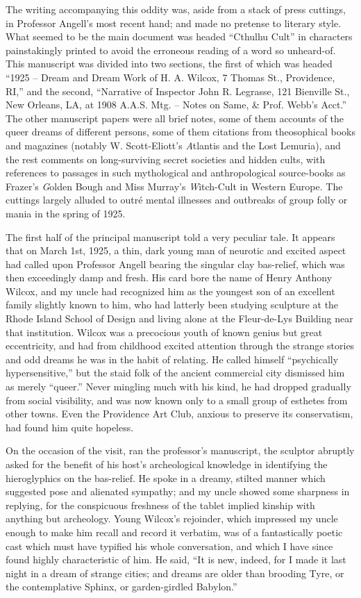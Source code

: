 The writing accompanying this oddity was, aside from a stack of press cuttings, in Professor Angell’s most recent hand; and made no pretense to literary style. What seemed to be the main document was headed “{\sc Cthulhu Cult}” in characters painstakingly printed to avoid the erroneous reading of a word so unheard-of. This manuscript was divided into two sections, the first of which was headed “1925⁠ – Dream and Dream Work of H. A. Wilcox, 7 Thomas St., Providence, RI,” and the second, “Narrative of Inspector John R. Legrasse, 121 Bienville St., New Orleans, LA, at 1908 A.A.S. Mtg.⁠ – Notes on Same, \& Prof. Webb’s Acct.” The other manuscript papers were all brief notes, some of them accounts of the queer dreams of different persons, some of them citations from theosophical books and magazines (notably W. Scott-Eliott’s {\emph Atlantis and the Lost Lemuria}), and the rest comments on long-surviving secret societies and hidden cults, with references to passages in such mythological and anthropological source-books as Frazer’s {\emph Golden Bough} and Miss Murray’s {\emph Witch-Cult in Western Europe}. The cuttings largely alluded to outré mental illnesses and outbreaks of group folly or mania in the spring of 1925.

\sectionbreak

The first half of the principal manuscript told a very peculiar tale. It appears that on March 1st, 1925, a thin, dark young man of neurotic and excited aspect had called upon Professor Angell bearing the singular clay bas-relief, which was then exceedingly damp and fresh. His card bore the name of Henry Anthony Wilcox, and my uncle had recognized him as the youngest son of an excellent family slightly known to him, who had latterly been studying sculpture at the Rhode Island School of Design and living alone at the Fleur-de-Lys Building near that institution. Wilcox was a precocious youth of known genius but great eccentricity, and had from childhood excited attention through the strange stories and odd dreams he was in the habit of relating. He called himself “psychically hypersensitive,” but the staid folk of the ancient commercial city dismissed him as merely “queer.” Never mingling much with his kind, he had dropped gradually from social visibility, and was now known only to a small group of esthetes from other towns. Even the Providence Art Club, anxious to preserve its conservatism, had found him quite hopeless.

On the occasion of the visit, ran the professor’s manuscript, the sculptor abruptly asked for the benefit of his host’s archeological knowledge in identifying the hieroglyphics on the bas-relief. He spoke in a dreamy, stilted manner which suggested pose and alienated sympathy; and my uncle showed some sharpness in replying, for the conspicuous freshness of the tablet implied kinship with anything but archeology. Young Wilcox’s rejoinder, which impressed my uncle enough to make him recall and record it verbatim, was of a fantastically poetic cast which must have typified his whole conversation, and which I have since found highly characteristic of him. He said, “It is new, indeed, for I made it last night in a dream of strange cities; and dreams are older than brooding Tyre, or the contemplative Sphinx, or garden-girdled Babylon.”

